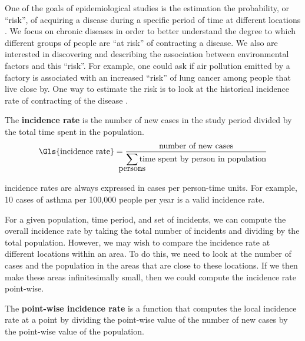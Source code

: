 

One of the goals of epidemiological studies is the estimation the probability,
or ``risk'',
of acquiring a disease during a specific period of time at different locations \citep{rothman2008modern}.
We focus on chronic diseases in order to better understand the degree to which different groups of people are ``at risk'' of contracting a disease.
We also are interested in discovering and describing the association between environmental factors and this ``risk''.
For example, one could ask if air pollution emitted by a factory is associated with an increased ``risk'' of lung cancer among people that live close by.
One way to estimate the \gls{risk} is to look at the historical \gls{incidence rate} of contracting of the disease \citep[Chapter 3]{rothman2008modern}.

\begin{defn}
    The \textbf{\gls{incidence rate}} is the number of new cases in the study period divided by the total time spent in the population.
    \begin{equation}
        \label{eq:incidencerate}
        \mbox{\Gls{incidence rate}} = \frac{\mbox{number of new cases}}
                                {\displaystyle\smashoperator{\sum\limits_{\mbox{persons}}}\mbox{time spent by person in population}}
    \end{equation}
\end{defn}

\Glspl{incidence rate} are always expressed in cases per person-time units.
For example, 10 cases of asthma per 100,000 people per year is a valid \gls{incidence rate}.

For a given population, time period, and set of \glspl{incident},
we can compute the overall \gls{incidence rate} by taking the total number of \glspl{incident} and dividing by the total population.
However, we may wish to compare the \gls{incidence rate} at different locations within an area.
To do this, we need to look at the number of cases and the population in the areas that are close to these locations.
If we then make these areas infinitesimally small,
then we could compute the \gls{incidence rate} point-wise.

\begin{defn}
    \label{defn:incidence_rate}
    The \textbf{point-wise \gls{incidence rate}} is a function that computes the local \gls{incidence rate} at a point by dividing the point-wise value of the number of new cases by the point-wise value of the population.
\end{defn}


